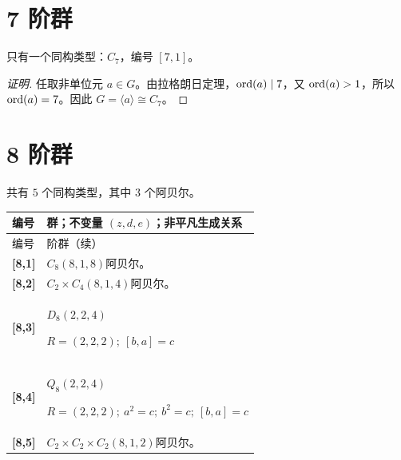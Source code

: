 \documentclass[UTF8,fontset=fandol,11pt,a4paper]{ctexart}
\begin{document}
\section*{7 阶群}\label{order:7}

只有一个同构类型：$C_{7}$，编号 $[7,1]$。

\begin{proof}[证明]
任取非单位元 $a\in G$。由拉格朗日定理，$\operatorname{ord}(a)\mid 7$，又 $\operatorname{ord}(a)>1$，所以 $\operatorname{ord}(a)=7$。因此 $G=\langle a\rangle\cong C_{7}$。
\end{proof}

\section*{8 阶群}\label{order:8}

共有 $5$ 个同构类型，其中 $3$ 个阿贝尔。

\begingroup\small\setlength{\tabcolsep}{3pt}\renewcommand{\arraystretch}{1.12}

\begin{longtable}{@{}p{17mm}>{\raggedright\arraybackslash}p{141mm}@{}}

\toprule 编号 & 群；不变量 $(z,d,e)$；非平凡生成关系\\\midrule\endfirsthead

\toprule 编号 & 8 阶群（续）\\\midrule\endhead\bottomrule\endfoot

\textbf{[8,1]} & $C_{8}$\quad $(8,1,8)$\quad 阿贝尔。\\[3pt]

\textbf{[8,2]} & $C_{2}\times C_{4}$\quad $(8,1,4)$\quad 阿贝尔。\\[3pt]

\textbf{[8,3]} & $D_{8}$\quad $(2,2,4)$\par\(R=(2,2,2);\allowbreak\ [b,a]=c\)\\[3pt]

\textbf{[8,4]} & $Q_{8}$\quad $(2,2,4)$\par\(R=(2,2,2);\allowbreak\ a^{2}=c;\allowbreak\ b^{2}=c;\allowbreak\ [b,a]=c\)\\[3pt]

\textbf{[8,5]} & $C_{2}\times C_{2}\times C_{2}$\quad $(8,1,2)$\quad 阿贝尔。\\[3pt]

\end{longtable}\endgroup
\end{document}
